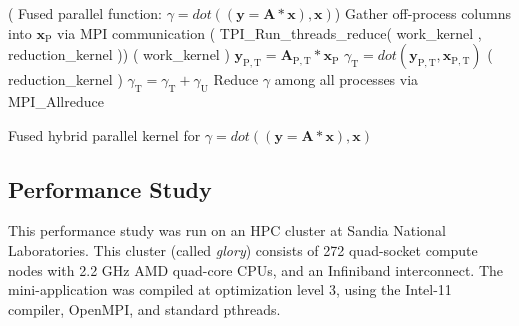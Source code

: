 \begin{algorithm}[h]
\SetLine
\dontprintsemicolon
\Begin( Fused parallel function: \mbox{$\gamma = dot( ( \mathbf{y} = \mathbf{A} * \mathbf{x} ) , \mathbf{x} )$}){
\BlankLine
Gather off-process columns into $\mathbf{x}_\mathrm{P}$ via MPI communication \;
\BlankLine
\Call( \textnormal{TPI\_Run\_threads\_reduce( work\_kernel , reduction\_kernel )}){
\BlankLine
\CallThread( \textnormal{work\_kernel} ){
\BlankLine
$\mathbf{y}_\mathrm{P,T} = \mathbf{A}_\mathrm{P,T} * \mathbf{x}_\mathrm{P}$ \; 
$\gamma_\mathrm{T} = dot( \mathbf{y}_\mathrm{P,T} , \mathbf{x}_\mathrm{P,T} )$ \; 
}
\CallThread( \textnormal{reduction\_kernel} ){
\BlankLine
$\gamma_\mathrm{T} = \gamma_\mathrm{T} + \gamma_\mathrm{U}$ \;
}
}
Reduce $\gamma$ among all processes  via MPI\_Allreduce
}
\caption{Fused hybrid parallel kernel for \mbox{$\gamma = dot( ( \mathbf{y} = \mathbf{A} * \mathbf{x} ) , \mathbf{x} )$} }
\label{alg:FusedMXV}
\end{algorithm}

\clearpage

\subsection{Performance Study}

This performance study was run on an HPC cluster at Sandia National Laboratories.
%
This cluster (called \emph{glory}) consists of 272 quad-socket compute nodes with 2.2 GHz AMD quad-core CPUs, and an Infiniband interconnect.
%
The mini-application was compiled at optimization level 3, using the Intel-11 compiler, OpenMPI, and standard pthreads.


